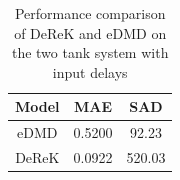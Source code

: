 \documentclass[conference]{IEEEtran}
\begin{document}
\begin{table}[htbp]\label{tab:two_tanks_results}
    \caption{Performance comparison of DeReK and eDMD on the two tank system with input delays}
    \begin{center}
        \begin{tabular}{c| S[table-format=1.4] S[table-format=3.2]}
            \toprule
            \textbf{Model} & \textbf{MAE} & \textbf{SAD} \\
            \midrule
            eDMD           & 0.5200       & 92.23        \\
            DeReK          & 0.0922       & 520.03       \\
            \bottomrule
        \end{tabular}
    \end{center}
\end{table}





\end{document}
